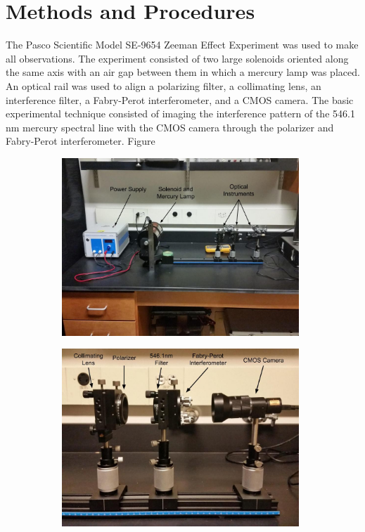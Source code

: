 \documentclass[twocolumn]{article}
\begin{document}
		
\section{Methods and Procedures}
	The Pasco Scientific Model SE-9654 Zeeman Effect Experiment was used to make all observations.
	The experiment consisted of two large solenoids oriented along the same axis with an air gap between them in which a mercury lamp was placed.
	An optical rail was used to align a polarizing filter, a collimating lens, an interference filter, a Fabry-Perot interferometer, and a CMOS camera.
	The basic experimental technique consisted of imaging the interference pattern of the 546.1 nm mercury spectral line with the CMOS camera through the polarizer and Fabry-Perot interferometer.
	Figure 
	
	\begin{figure}
		\centering
		\begin{subfigure}{0.5\textwidth}
			\includegraphics[width = 0.98\textwidth]{Images/ExperimentOverview.jpg}
			\caption{}
			\label{subfig:Overview}
			
		\end{subfigure}%
		\begin{subfigure}{0.5\textwidth}
				\includegraphics[width = 0.98\textwidth]{Images/OpticsRail.jpg}
				\caption{}
				\label{subfig:OpticsRail}
				

\end{subfigure}
\end{figure}
\end{document}
